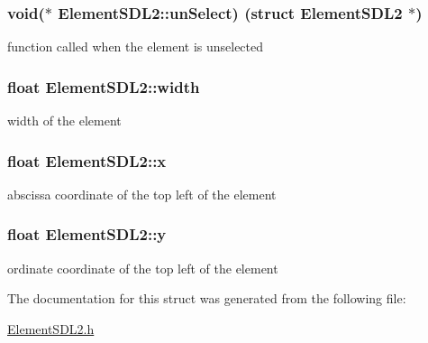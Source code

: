 \subsubsection[{\texorpdfstring{un\+Select}{unSelect}}]{\setlength{\rightskip}{0pt plus 5cm}void($\ast$ Element\+S\+D\+L2\+::un\+Select) (struct {\bf Element\+S\+D\+L2} $\ast$)}\hypertarget{structElementSDL2_a8057ee0d19cdd60ec568076206ee0e12}{}\label{structElementSDL2_a8057ee0d19cdd60ec568076206ee0e12}
function called when the element is unselected 
\subsubsection[{\texorpdfstring{width}{width}}]{\setlength{\rightskip}{0pt plus 5cm}float Element\+S\+D\+L2\+::width}\hypertarget{structElementSDL2_a1dc0d58f7dfad658560111bd8d37a114}{}\label{structElementSDL2_a1dc0d58f7dfad658560111bd8d37a114}
width of the element 
\subsubsection[{\texorpdfstring{x}{x}}]{\setlength{\rightskip}{0pt plus 5cm}float Element\+S\+D\+L2\+::x}\hypertarget{structElementSDL2_a85c4f16793909cb2ab4fc3d1da0ad788}{}\label{structElementSDL2_a85c4f16793909cb2ab4fc3d1da0ad788}
abscissa coordinate of the top left of the element 
\subsubsection[{\texorpdfstring{y}{y}}]{\setlength{\rightskip}{0pt plus 5cm}float Element\+S\+D\+L2\+::y}\hypertarget{structElementSDL2_a07636d9e6dc09c88aaff9062b2db5278}{}\label{structElementSDL2_a07636d9e6dc09c88aaff9062b2db5278}
ordinate coordinate of the top left of the element 

The documentation for this struct was generated from the following file\+:\begin{DoxyCompactItemize}
\item 
\hyperlink{ElementSDL2_8h}{Element\+S\+D\+L2.\+h}\end{DoxyCompactItemize}
